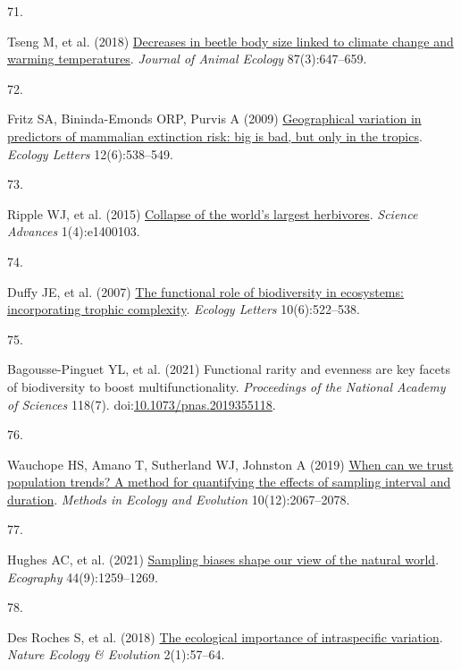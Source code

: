 \documentclass{article}
\newlength{\cslhangindent}
\newlength{\csllabelwidth}
\newlength{\cslentryspacingunit} %
\newenvironment{CSLReferences}[2] %
 {%
  \setlength{\parindent}{0pt}
  \ifodd #1
  \let\oldpar\par
  \def\par{\hangindent=\cslhangindent\oldpar}
  \fi
  \setlength{\parskip}{#2\cslentryspacingunit}
 }%
 {}
\newcommand{\CSLLeftMargin}[1]{\parbox[t]{\csllabelwidth}{#1}}
\newcommand{\CSLRightInline}[1]{\parbox[t]{\linewidth - \csllabelwidth}{#1}\break}
\begin{document}
\begin{CSLReferences}{0}{0}
\leavevmode{}%
\CSLLeftMargin{71. }%
\CSLRightInline{Tseng M, et al. (2018)
\href{https://doi.org/10.1111/1365-2656.12789}{Decreases in beetle body
size linked to climate change and warming temperatures}. \emph{Journal
of Animal Ecology} 87(3):647--659.}

\leavevmode{}%
\CSLLeftMargin{72. }%
\CSLRightInline{Fritz SA, Bininda-Emonds ORP, Purvis A (2009)
\href{https://doi.org/10.1111/j.1461-0248.2009.01307.x}{Geographical
variation in predictors of mammalian extinction risk: big is bad, but
only in the tropics}. \emph{Ecology Letters} 12(6):538--549.}

\leavevmode{}%
\CSLLeftMargin{73. }%
\CSLRightInline{Ripple WJ, et al. (2015)
\href{https://doi.org/10.1126/sciadv.1400103}{Collapse of the world{'}s
largest herbivores}. \emph{Science Advances} 1(4):e1400103.}

\leavevmode{}%
\CSLLeftMargin{74. }%
\CSLRightInline{Duffy JE, et al. (2007)
\href{https://doi.org/10.1111/j.1461-0248.2007.01037.x}{The functional
role of biodiversity in ecosystems: incorporating trophic complexity}.
\emph{Ecology Letters} 10(6):522--538.}

\leavevmode{}%
\CSLLeftMargin{75. }%
\CSLRightInline{Bagousse-Pinguet YL, et al. (2021) Functional rarity and
evenness are key facets of biodiversity to boost multifunctionality.
\emph{Proceedings of the National Academy of Sciences} 118(7).
doi:\href{https://doi.org/10.1073/pnas.2019355118}{10.1073/pnas.2019355118}.}

\leavevmode{}%
\CSLLeftMargin{76. }%
\CSLRightInline{Wauchope HS, Amano T, Sutherland WJ, Johnston A (2019)
\href{https://doi.org/10.1111/2041-210X.13302}{When can we trust
population trends? A method for quantifying the effects of sampling
interval and duration}. \emph{Methods in Ecology and Evolution}
10(12):2067--2078.}

\leavevmode{}%
\CSLLeftMargin{77. }%
\CSLRightInline{Hughes AC, et al. (2021)
\href{https://doi.org/10.1111/ecog.05926}{Sampling biases shape our view
of the natural world}. \emph{Ecography} 44(9):1259--1269.}

\leavevmode{}%
\CSLLeftMargin{78. }%
\CSLRightInline{Des Roches S, et al. (2018)
\href{https://doi.org/10.1038/s41559-017-0402-5}{The ecological
importance of intraspecific variation}. \emph{Nature Ecology \&
Evolution} 2(1):57--64.}


\end{CSLReferences}
\end{document}
